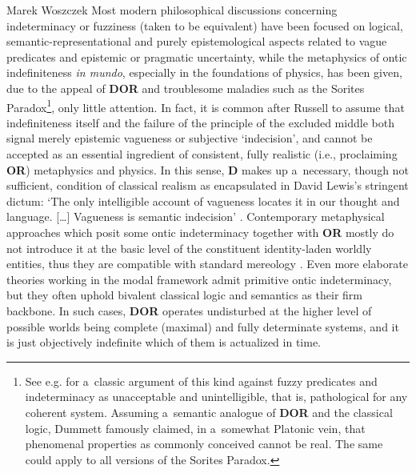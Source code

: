 \begin{artengenv}{Marek Woszczek}
Most modern philosophical discussions concerning indeterminacy or fuzziness (taken to be equivalent) have been focused on logical, semantic-representational and purely epistemological aspects related to vague predicates and epistemic or pragmatic uncertainty, while the metaphysics of ontic indefiniteness \textit{in mundo}, especially in the foundations of physics, has been given, due to the appeal of \textbf{DOR} and troublesome maladies such as the Sorites Paradox\footnote{See e.g.
\parencite[][]{dummett_wangs_1975} %
 for a~classic argument of this kind against fuzzy predicates and indeterminacy as unacceptable and unintelligible, that is, pathological for any coherent system. Assuming a~semantic analogue of \textbf{DOR} and the classical logic, Dummett famously claimed, in a~somewhat Platonic vein, that phenomenal properties as commonly conceived cannot be real. The same could apply to all versions of the Sorites Paradox.}, only little attention. In fact, it is common after Russell to assume that indefiniteness itself and the failure of the principle of the excluded middle both signal merely epistemic vagueness or subjective ‘indecision', and cannot be accepted as an essential ingredient of consistent, fully realistic (i.e., proclaiming \textbf{OR}) metaphysics and physics. In this sense, \textbf{D} makes up a~necessary, though not sufficient, condition of classical realism as encapsulated in David Lewis's stringent dictum: ‘The only intelligible account of vagueness locates it in our thought and language. […] Vagueness is semantic indecision' 
\parencite[][p.212]{lewis_plurality_1986}. %
 Contemporary metaphysical approaches which posit some ontic indeterminacy together with \textbf{OR} mostly do not introduce it at the basic level of the constituent identity-laden worldly entities, thus they are compatible with standard mereology 
\parencite[cf. e.g.][]{morreau_what_2002}. %
 Even more elaborate theories working in the modal framework 
\parencites[e.g.][]{akiba_vagueness_2004}[][]{akiba_vagueness_2004} %
 admit primitive ontic indeterminacy, but they often uphold bivalent classical logic and semantics as their firm backbone. In such cases, \textbf{DOR} operates undisturbed at the higher level of possible worlds being complete (maximal) and fully determinate systems, and it is just objectively indefinite which of them is actualized in time.


\end{artengenv}
